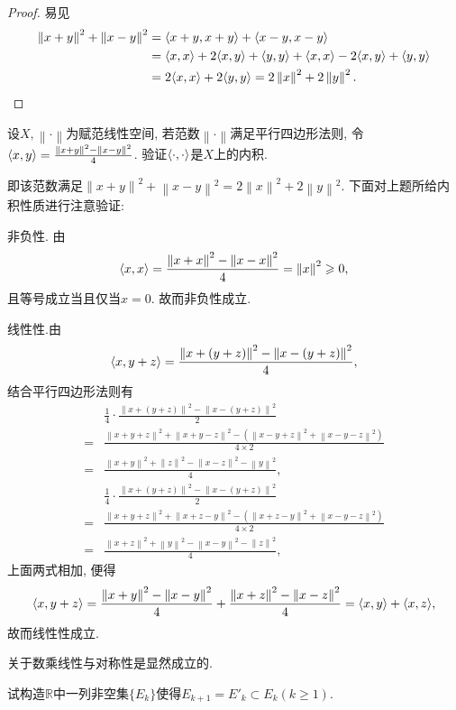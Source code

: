 \begin{quizb}
\begin{proof}
易见\[\begin{split}
\left\|x+y\right\|^2+\left\|x-y\right\|^2&=\langle x+y,x+y \rangle+\langle x-y,x-y \rangle\\&=\langle x,x \rangle+2\langle x,y \rangle+\langle y,y \rangle+\langle x,x \rangle-2\langle x,y \rangle+\langle y,y \rangle\\&=2\langle x,x \rangle+2\langle y,y \rangle=2\left\|x\right\|^2+2\left\|y\right\|^2.\qedhere
\end{split}\]
\end{proof}
\woe 设\(X,\left\|\cdot\right\|\)为赋范线性空间, 若范数\(\left\|\cdot\right\|\)满足平行四边形法则, 令\(\langle x,y \rangle=\frac{\left\|x+y\right\|^2-\left\|x-y\right\|^2}{4}\). 验证\(\langle \cdot,\cdot \rangle\)是\(X\)上的内积.
\begin{solution}
即该范数满足\(\left\|x+y\right\|^2+\left\|x-y\right\|^2=2\left\|x\right\|^2+2\left\|y\right\|^2.\) 下面对上题所给内积性质进行注意验证:
\begin{asparaenum}[(1)]
    \item 非负性. 由\[\langle x,x \rangle=\frac{\left\|x+x\right\|^2-\left\|x-x\right\|^2}{4}=\left\|x\right\|^2\geqslant 0,\]且等号成立当且仅当\(x=0\). 故而非负性成立.
    \item 线性性.由\[\langle x,y+z \rangle=\frac{\left\|x+(y+z)\right\|^2-\left\|x-(y+z)\right\|^2}{4},\]结合平行四边形法则有\[\begin{split}
    &\frac{1}{4}\cdot\frac{\left\|x+(y+z)\right\|^2-\left\|x-(y+z)\right\|^2}{2}\\=&\frac{\left\|x+y+z\right\|^2+\left\|x+y-z\right\|^2-\left(\left\|x-y+z\right\|^2+\left\|x-y-z\right\|^2\right)}{4\times2}\\=&\frac{\left\|x+y\right\|^2+\left\|z\right\|^2-\left\|x-z\right\|^2-\left\|y\right\|^2}{4},\\
    &\frac{1}{4}\cdot\frac{\left\|x+(y+z)\right\|^2-\left\|x-(y+z)\right\|^2}{2}\\=&\frac{\left\|x+y+z\right\|^2+\left\|x+z-y\right\|^2-\left(\left\|x+z-y\right\|^2+\left\|x-y-z\right\|^2\right)}{4\times 2}\\=&\frac{\left\|x+z\right\|^2+\left\|y\right\|^2-\left\|x-y\right\|^2-\left\|z\right\|^2}{4},
    \end{split}\]上面两式相加, 便得\[\langle x,y+z \rangle=\frac{\left\|x+y\right\|^2-\left\|x-y\right\|^2}{4}+\frac{\left\|x+z\right\|^2-\left\|x-z\right\|^2}{4}=\langle x,y \rangle+\langle x,z \rangle,\]故而线性性成立.
    \item 关于数乘线性与对称性是显然成立的.\qedhere
\end{asparaenum}
\end{solution}
\woe 试构造\(\mathbb{R}\)中一列非空集\(\{E_k\}\)使得\(E_{k+1}=E'_k\subset E_k (k\geqslant 1)\).
\end{quizb}
